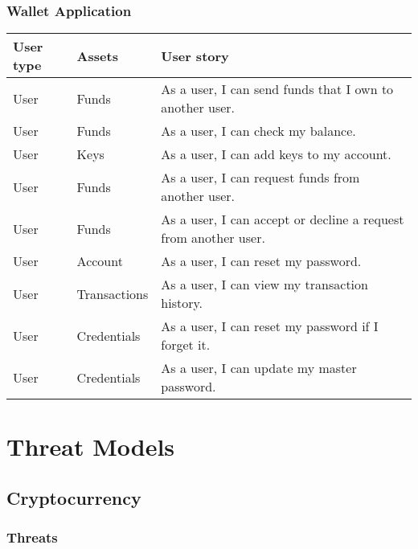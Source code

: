\documentclass[12pt]{article}
\begin{document}
\subsubsection*{Wallet Application}

\begin{tabularx}{\linewidth}{|l|l|X|}
\hline
\textbf{User type} & \textbf{Assets} & \textbf{User story} \\
\hline
User & Funds & As a user, I can send funds that I own to another user. \\
\hline
User & Funds & As a user, I can check my balance. \\
\hline
User & Keys & As a user, I can add keys to my account. \\
\hline
User & Funds & As a user, I can request funds from another user. \\
\hline
User & Funds & As a user, I can accept or decline a request from another user. \\
\hline
User & Account & As a user, I can reset my password. \\
\hline
User & Transactions & As a user, I can view my transaction history. \\
\hline
User & Credentials & As a user, I can reset my password if I forget it. \\
\hline
User & Credentials & As a user, I can update my master password. \\
\hline
\end{tabularx}

\section{Threat Models}

\subsection{Cryptocurrency}

\subsubsection*{Threats}
\end{document}
